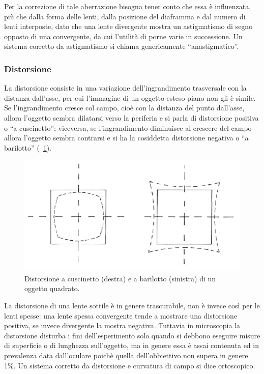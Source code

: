 Per la correzione di tale aberrazione bisogna tener conto che essa è influenzata, più che dalla forma delle lenti, dalla posizione del diaframma e dal numero di lenti interposte, dato che una lente divergente mostra un astigmatismo di segno opposto di una convergente, da cui l'utilità di porne varie in successione. 
Un sistema corretto da astigmatismo si chiama genericamente ``anastigmatico''. 

\subsubsection{Distorsione}
La distorsione consiste in una variazione dell'ingrandimento trasversale con la distanza dall'asse, per cui l'immagine di un oggetto esteso piano non gli è simile. 
Se l'ingrandimento cresce col campo, cioè con la distanza del punto dall'asse, allora l'oggetto sembra dilatarsi verso la periferia e si parla di distorsione positiva o ``a cuscinetto''; viceversa, se l'ingrandimento diminuisce al crescere del campo allora l'oggetto sembra contrarsi e si ha la cosiddetta distorsione negativa o ``a barilotto'' (\figurename~\ref{fig:distorsione}).

\begin{figure}
 \centering
 \includegraphics[scale=.60]{img/CAP2disto.png}
 \caption{\small{Distorsione a cuscinetto (destra) e a barilotto (sinistra) di un oggetto quadrato.}}
 \label{fig:distorsione}
\end{figure}

La distorsione di una lente sottile è in genere trascurabile, non è invece così per le lenti spesse: una lente spessa convergente tende a mostrare una distorsione positiva, se invece divergente la mostra negativa.
Tuttavia in microscopia la distorsione disturba i fini dell'esperimento solo quando si debbono eseguire misure di superficie o di lunghezza sull'oggetto, ma in genere essa è assai contenuta ed in prevalenza data dall'oculare poichè quella dell'obbiettivo non supera in genere 1\%.
Un sistema corretto da distorsione e curvatura di campo si dice ortoscopico.


